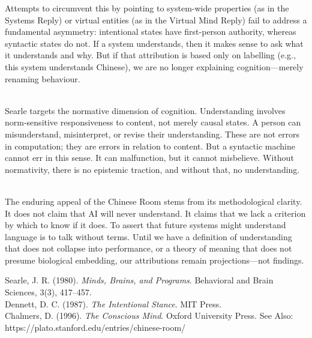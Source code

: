\begin{technical}
Attempts to circumvent this by pointing to system-wide properties (as in the Systems Reply) or virtual entities (as in the Virtual Mind Reply) fail to address a fundamental asymmetry: intentional states have first-person authority, whereas syntactic states do not. If a system \QSOpen{}understands,\QSClose{} then it makes sense to ask what it understands and why. But if that attribution is based only on labelling (e.g., \QSOpen{}this system understands Chinese\QSClose{}), we are no longer explaining cognition—merely renaming behaviour.

\\[0.5em]
Searle targets the normative dimension of cognition. Understanding involves norm-sensitive responsiveness to content, not merely causal states. A person can misunderstand, misinterpret, or revise their understanding. These are not errors in computation; they are errors in relation to content. But a syntactic machine cannot err in this sense. It can malfunction, but it cannot misbelieve. Without normativity, there is no epistemic traction, and without that, no understanding.

\\[0.5em]
The enduring appeal of the Chinese Room stems from its methodological clarity. It does not claim that AI will never understand. It claims that we lack a criterion by which to know if it does. To assert that future systems might understand language is to talk without terms. Until we have a definition of understanding that does not collapse into performance, or a theory of meaning that does not presume biological embedding, our attributions remain projections—not findings.

\techref
{\footnotesize
Searle, J. R. (1980). \textit{Minds, Brains, and Programs}. Behavioral and Brain Sciences, 3(3), 417–457.\\
Dennett, D. C. (1987). \textit{The Intentional Stance}. MIT Press.\\
Chalmers, D. (1996). \textit{The Conscious Mind}. Oxford University Press.
See Also: https://plato.stanford.edu/entries/chinese-room/
}
\end{technical}

